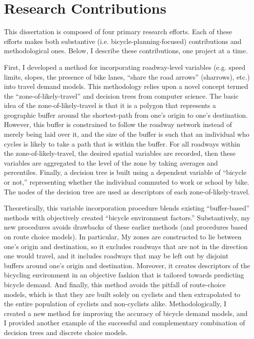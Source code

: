 \documentclass{article}
\begin{document}
\section{Research Contributions}
This dissertation is composed of four primary research efforts. Each of these efforts makes both substantive (i.e. bicycle-planning-focused) contributions and methodological ones. Below, I describe these contributions, one project at a time.

First, I developed a method for incorporating roadway-level variables (e.g. speed limits, slopes, the presence of bike lanes, ``share the road arrows'' (sharrows), etc.) into travel demand models. This methodology relies upon a novel concept termed the ``zone-of-likely-travel'' and decision trees from computer science. The basic idea of the zone-of-likely-travel is that it is a polygon that represents a geographic buffer around the shortest-path from one's origin to one's destination. However, this buffer is constrained to follow the roadway network instead of merely being laid over it, and the size of the buffer is such that an individual who cycles is likely to take a path that is within the buffer. For all roadways within the zone-of-likely-travel, the desired spatial variables are recorded, then these variables are aggregated to the level of the zone by taking averages and percentiles. Finally, a decision tree is built using a dependent variable of ``bicycle or not,'' representing whether the individual commuted to work or school by bike. The nodes of the decision tree are used as descriptors of each zone-of-likely-travel.

Theoretically, this variable incorporation procedure blends existing ``buffer-based'' methods with objectively created ``bicycle environment factors.'' Substantively, my new procedures avoids drawbacks of these earlier methods (and procedures based on route choice models). In particular, My zones are constructed to lie between one's origin and destination, so it excludes roadways that are not in the direction one would travel, and it includes roadways that may be left out by disjoint buffers around one's origin and destination. Moreover, it creates descriptors of the bicycling environment in an objective fashion that is tailored towards predicting bicycle demand. And finally, this method avoids the pitfall of route-choice models, which is that they are built solely on cyclists and then extrapolated to the entire population of cyclists and non-cyclists alike. Methodologically, I created a new method for improving the accuracy of bicycle demand models, and I provided another example of the successful and complementary combination of decision trees and discrete choice models.
\end{document}

